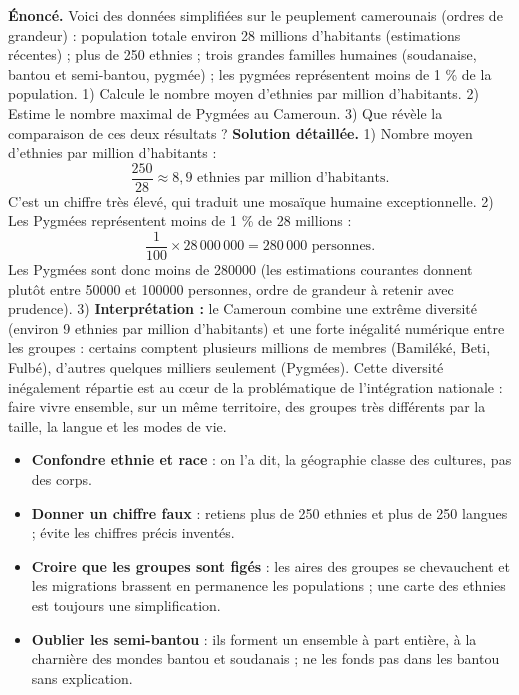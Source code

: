 \documentclass[11pt]{article}
\begin{document}
\begin{exoresolu}
\textbf{Énoncé.} Voici des données simplifiées sur le peuplement camerounais (ordres de grandeur) : population totale environ 28 millions d'habitants (estimations récentes) ; plus de 250 ethnies ; trois grandes familles humaines (soudanaise, bantou et semi-bantou, pygmée) ; les pygmées représentent moins de 1 \% de la population.
1) Calcule le nombre moyen d'ethnies par million d'habitants.
2) Estime le nombre maximal de Pygmées au Cameroun.
3) Que révèle la comparaison de ces deux résultats ?
\tcblower
\textbf{Solution détaillée.}
1) Nombre moyen d'ethnies par million d'habitants :
\[ \frac{250}{28} \approx 8,9 \text{ ethnies par million d'habitants.} \]
C'est un chiffre très élevé, qui traduit une mosaïque humaine exceptionnelle.
2) Les Pygmées représentent moins de 1 \% de 28 millions :
\[ \frac{1}{100} \times 28\,000\,000 = 280\,000 \text{ personnes.} \]
Les Pygmées sont donc moins de \num{280000} (les estimations courantes donnent plutôt entre \num{50000} et \num{100000} personnes, ordre de grandeur à retenir avec prudence).
3) \textbf{Interprétation :} le Cameroun combine une extrême diversité (environ 9 ethnies par million d'habitants) et une forte inégalité numérique entre les groupes : certains comptent plusieurs millions de membres (Bamiléké, Beti, Fulbé), d'autres quelques milliers seulement (Pygmées). Cette diversité inégalement répartie est au cœur de la problématique de l'intégration nationale : faire vivre ensemble, sur un même territoire, des groupes très différents par la taille, la langue et les modes de vie.
\end{exoresolu}

\begin{attention}
\begin{itemize}
\item \textbf{Confondre ethnie et race} : on l'a dit, la géographie classe des cultures, pas des corps.
\item \textbf{Donner un chiffre faux} : retiens \og plus de 250 ethnies \fg{} et \og plus de 250 langues \fg{} ; évite les chiffres précis inventés.
\item \textbf{Croire que les groupes sont figés} : les aires des groupes se chevauchent et les migrations brassent en permanence les populations ; une carte des ethnies est toujours une simplification.
\item \textbf{Oublier les semi-bantou} : ils forment un ensemble à part entière, à la charnière des mondes bantou et soudanais ; ne les fonds pas dans les bantou sans explication.
\end{itemize}
\end{attention}
\end{document}
